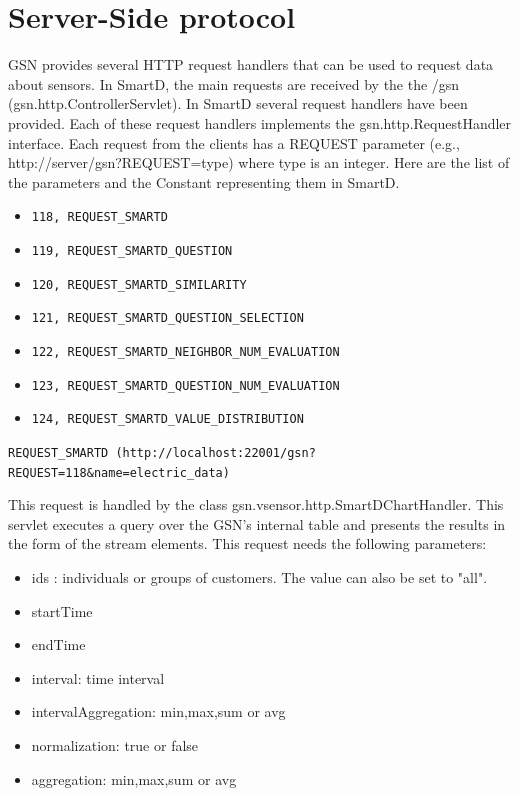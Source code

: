 \documentclass[12pt]{article}
\begin{document}
       
\section{Server-Side protocol}
      GSN provides several HTTP request handlers that can be used to request data about sensors. In SmartD, the main requests are received by the the /gsn (gsn.http.ControllerServlet). In SmartD several request handlers have been provided. Each of these request handlers implements the gsn.http.RequestHandler interface. Each request from the clients has a REQUEST parameter (e.g., http://server/gsn?REQUEST=type) where type is an integer. Here are the list of the parameters and the Constant representing them in SmartD.
      
      
\begin{itemize}
  \item \texttt{118, REQUEST\_SMARTD}
  \item \texttt{119, REQUEST\_SMARTD\_QUESTION}
  \item \texttt{120, REQUEST\_SMARTD\_SIMILARITY}
  \item \texttt{121, REQUEST\_SMARTD\_QUESTION\_SELECTION}
  \item \texttt{122, REQUEST\_SMARTD\_NEIGHBOR\_NUM\_EVALUATION}
  \item \texttt{123, REQUEST\_SMARTD\_QUESTION\_NUM\_EVALUATION}
  \item \texttt{124, REQUEST\_SMARTD\_VALUE\_DISTRIBUTION}
\end{itemize}

\vspace{1cm}

\texttt{REQUEST\_SMARTD (http://localhost:22001/gsn?REQUEST=118\&name=electric\_data)}

\vspace{0.5cm}

This request is handled by the class gsn.vsensor.http.SmartDChartHandler. This servlet executes a query over the GSN's internal table and presents the results in the form of the stream elements. This request needs the following parameters: 

\begin{itemize}
  \item ids : individuals or groups of customers. The value can also be set to "all".
  \item startTime
  \item endTime
  \item interval: time interval
  \item intervalAggregation: min,max,sum or avg
  \item normalization: true or false
  \item aggregation: min,max,sum or avg
\end{itemize}
      
\end{document}
